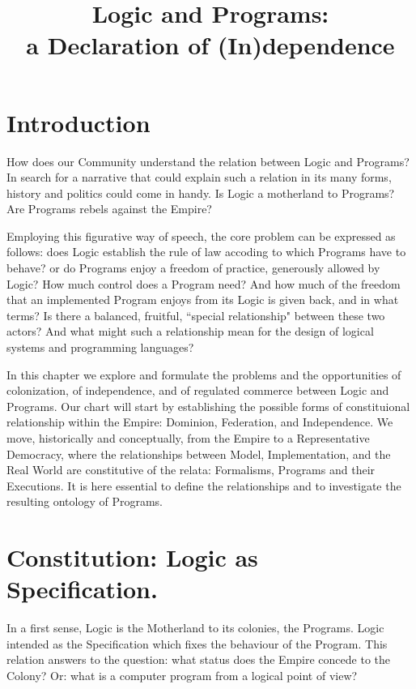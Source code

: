 \documentclass[]{article}
\title{Logic and Programs:\\
	 a Declaration of (In)dependence}
\author{}
\date{}
\begin{document}
\tableofcontents
\maketitle

%



\section{Introduction}
\label{sect:intro}

How does our Community understand the relation between Logic and Programs? In search for a narrative that could explain such a relation in its many forms, history and politics could come in handy. Is Logic a motherland to Programs? Are Programs rebels against the Empire?

Employing this figurative way of speech, the core problem can be expressed as follows: does Logic establish the rule of law accoding to which Programs have to behave? or do Programs enjoy a freedom of practice, generously allowed by Logic? How much control does a Program need? And how much of the freedom that an implemented Program enjoys from its Logic is given back, and in what terms? Is there a balanced, fruitful, ``special relationship" between these two actors? And what might such a relationship mean for the design of logical systems and programming languages?

In this chapter we explore and formulate the problems and the opportunities of colonization, of independence, and of regulated commerce between Logic and Programs. Our chart will start by establishing the possible forms of constituional relationship within the Empire: Dominion, Federation, and Independence. We move, historically and conceptually, from the Empire to a Representative Democracy, where the relationships between Model, Implementation, and the Real World are constitutive of the relata: Formalisms, Programs and their Executions. It is here essential to define the relationships and to investigate the resulting ontology of Programs. 


\section{Constitution: Logic as Specification.}

In a first sense, Logic is the Motherland to its colonies, the Programs. Logic intended as the Specification which fixes the behaviour of the Program. This relation answers to the question: what status does the Empire concede to the Colony? Or: what is a computer program from a logical point of view?
\end{document}
